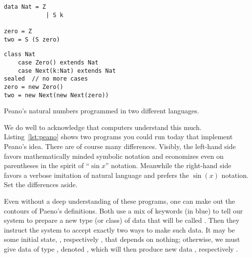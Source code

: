 \begin{lstfloat}
\begin{center}
\begin{minipage}{0.4\textwidth}
\begin{lstlisting}[language=Hidris]
data Nat = Z 
            | S k

zero = Z
two = S (S zero)
\end{lstlisting}
\end{minipage}
\hfill
\begin{minipage}{0.55\textwidth}
\begin{lstlisting}[language=Sava]
class Nat
    case Zero() extends Nat
    case Next(k:Nat) extends Nat
sealed  // no more cases
zero = new Zero()
two = new Next(new Next(zero))
\end{lstlisting}
\end{minipage}
\end{center}
\caption{Peano's natural numbers programmed in two different languages.}
\label{lst:peano}
\end{lstfloat}
    
We do well to acknowledge that computers understand this much.
Listing~\ref{lst:peano} shows two programs you could run today that implement Peano's idea.
There are of course many differences.  Visibly, the left-hand side 
favors mathematically minded symbolic notation and 
economizes even on parentheses in the spirit of ``$\sin x$'' notation.
Meanwhile the right-hand side favors a verbose imitation of 
natural language and prefers the $\sin(x)$ notation.  Set the differences 
aside.

Even without a deep understanding of these programs, one can 
make out the contours of Paeno's definitions.  Both use a mix of 
keywords (in blue) to tell our system to prepare a new type (or class) of data 
that will be called .  Then they instruct the system 
to accept exactly two ways to make such data.
It may be some initial state, , respectively 
, that depends on nothing;
otherwise, we must give data  of type ,
denoted , which will then produce new data 
, respectively .

